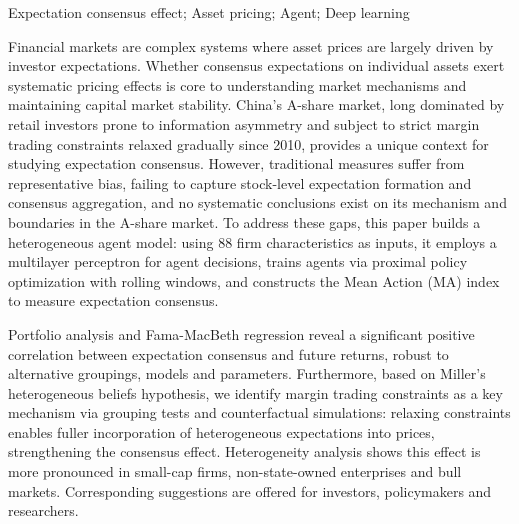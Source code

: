 \begin{enabstract}{Expectation consensus effect; Asset pricing; Agent; Deep learning}

Financial markets are complex systems where asset prices are largely driven by investor expectations. Whether consensus expectations on individual assets exert systematic pricing effects is core to understanding market mechanisms and maintaining capital market stability. China's A-share market, long dominated by retail investors prone to information asymmetry and subject to strict margin trading constraints relaxed gradually since 2010, provides a unique context for studying expectation consensus. However, traditional measures suffer from representative bias, failing to capture stock-level expectation formation and consensus aggregation, and no systematic conclusions exist on its mechanism and boundaries in the A-share market. To address these gaps, this paper builds a heterogeneous agent model: using 88 firm characteristics as inputs, it employs a multilayer perceptron for agent decisions, trains agents via proximal policy optimization with rolling windows, and constructs the Mean Action (MA) index to measure expectation consensus.

Portfolio analysis and Fama-MacBeth regression reveal a significant positive correlation between expectation consensus and future returns, robust to alternative groupings, models and parameters. Furthermore, based on Miller's heterogeneous beliefs hypothesis, we identify margin trading constraints as a key mechanism via grouping tests and counterfactual simulations: relaxing constraints enables fuller incorporation of heterogeneous expectations into prices, strengthening the consensus effect. Heterogeneity analysis shows this effect is more pronounced in small-cap firms, non-state-owned enterprises and bull markets. Corresponding suggestions are offered for investors, policymakers and researchers.

\end{enabstract}
\newpage
